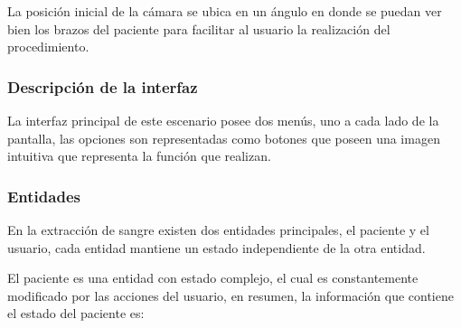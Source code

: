 La posición inicial de la cámara se ubica en un ángulo en donde se puedan ver 
bien los brazos del paciente para facilitar al usuario la realización del 
procedimiento.


\subsubsection{Descripción de la interfaz}

La interfaz principal de este escenario posee dos menús, uno a cada lado de la
pantalla, las opciones son representadas como botones que poseen una imagen
intuitiva que representa la
función que realizan. 

\subsubsection{Entidades}

En la extracción de sangre existen dos entidades principales, el paciente y el
usuario, cada entidad mantiene un estado independiente de la otra entidad.

El paciente es una entidad con estado complejo, el cual es constantemente
modificado por las acciones del usuario, en resumen, la información que contiene
el estado del paciente es:

